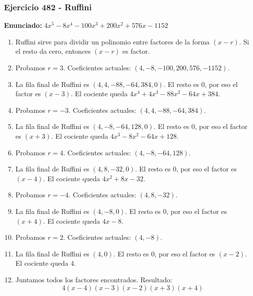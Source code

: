 \documentclass[11pt,a4paper]{article}
\begin{document}
\subsubsection*{Ejercicio 482 - Ruffini}
\textbf{Enunciado:} $ 4 x^{5} - 8 x^{4} - 100 x^{3} + 200 x^{2} + 576 x - 1152 $\par
\begin{enumerate}[leftmargin=2em]
\item Ruffini sirve para dividir un polinomio entre factores de la forma \((x-r)\). Si el resto da cero, entonces \((x-r)\) es factor.
\item Probamos \(r=3\). Coeficientes actuales: \((4, -8, -100, 200, 576, -1152)\).
\item La fila final de Ruffini es \((4, 4, -88, -64, 384, 0)\). El resto es \(0\), por eso el factor es \((x-3)\). El cociente queda \(4 x^{4} + 4 x^{3} - 88 x^{2} - 64 x + 384\).
\item Probamos \(r=-3\). Coeficientes actuales: \((4, 4, -88, -64, 384)\).
\item La fila final de Ruffini es \((4, -8, -64, 128, 0)\). El resto es \(0\), por eso el factor es \((x+3)\). El cociente queda \(4 x^{3} - 8 x^{2} - 64 x + 128\).
\item Probamos \(r=4\). Coeficientes actuales: \((4, -8, -64, 128)\).
\item La fila final de Ruffini es \((4, 8, -32, 0)\). El resto es \(0\), por eso el factor es \((x-4)\). El cociente queda \(4 x^{2} + 8 x - 32\).
\item Probamos \(r=-4\). Coeficientes actuales: \((4, 8, -32)\).
\item La fila final de Ruffini es \((4, -8, 0)\). El resto es \(0\), por eso el factor es \((x+4)\). El cociente queda \(4 x - 8\).
\item Probamos \(r=2\). Coeficientes actuales: \((4, -8)\).
\item La fila final de Ruffini es \((4, 0)\). El resto es \(0\), por eso el factor es \((x-2)\). El cociente queda \(4\).
\item Juntamos todos los factores encontrados. Resultado: \[\boxed{4 \left(x - 4\right) \left(x - 3\right) \left(x - 2\right) \left(x + 3\right) \left(x + 4\right)}\]
\end{enumerate}

\vspace{0.2cm}
\end{document}
